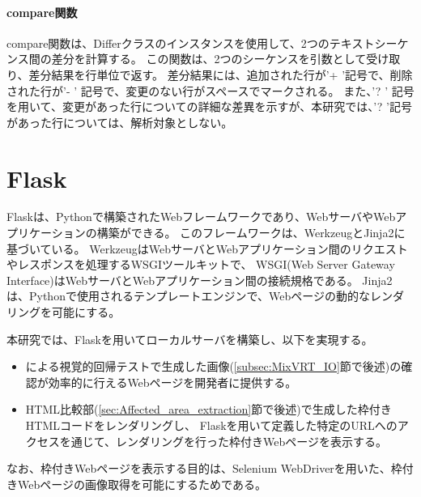 \paragraph{compare関数}
compare関数は、Differクラスのインスタンスを使用して、2つのテキストシーケンス間の差分を計算する。
この関数は、2つのシーケンスを引数として受け取り、差分結果を行単位で返す。
差分結果には、追加された行が'+ '記号で、削除された行が'- ' 記号で、変更のない行がスペースでマークされる。
また、'? ' 記号を用いて、変更があった行についての詳細な差異を示すが、本研究では、'? '記号があった行については、解析対象としない。



\section{Flask}\label{sec:Flask}
Flask\cite{Flask}は、Pythonで構築されたWebフレームワークであり、WebサーバやWebアプリケーションの構築ができる。
このフレームワークは、Werkzeug\cite{Werkzeug}とJinja2\cite{Jinja}に基づいている。
WerkzeugはWebサーバとWebアプリケーション間のリクエストやレスポンスを処理するWSGIツールキットで、
WSGI(Web Server Gateway Interface)\cite{WSGI}はWebサーバとWebアプリケーション間の接続規格である。
Jinja2は、Pythonで使用されるテンプレートエンジンで、Webページの動的なレンダリングを可能にする。
\par
本研究では、Flaskを用いてローカルサーバを構築し、以下を実現する。
\begin{itemize}
      \setlength{\itemsep}{0pt}
            \setlength{\parsep}{0pt}
      \item \toolName による視覚的回帰テストで生成した画像(\ref{subsec:MixVRT_IO}節で後述)の確認が効率的に行えるWebページを開発者に提供する。
      \item HTML比較部(\ref{sec:Affected_area_extraction}節で後述)で生成した枠付きHTMLコードをレンダリングし、
            Flaskを用いて定義した特定のURLへのアクセスを通じて、レンダリングを行った枠付きWebページを表示する。
\end{itemize}
なお、枠付きWebページを表示する目的は、Selenium WebDriverを用いた、枠付きWebページの画像取得を可能にするためである。

